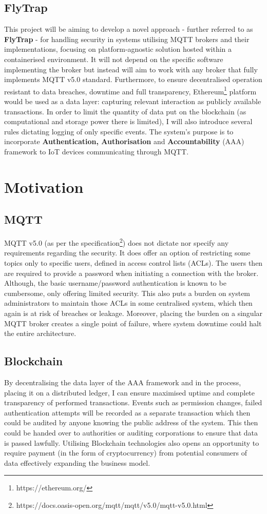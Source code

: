 \subsection{FlyTrap}
This project will be aiming to develop a novel approach - further referred to as \textbf{FlyTrap} - for handling security in systems utilising MQTT brokers and their implementations, focusing on platform-agnostic solution hosted within a containerised environment. It will not depend on the specific software implementing the broker but instead will aim to work with any broker that fully implements MQTT v5.0 standard. Furthermore, to ensure decentralised operation resistant to data breaches, downtime and full transparency, Ethereum\footnote{https://ethereum.org/} platform would be used as a data layer: capturing relevant interaction as publicly available transactions. In order to limit the quantity of data put on the blockchain (as computational and storage power there is limited), I will also introduce several rules dictating logging of only specific events. The system's purpose is to incorporate \textbf{Authentication, Authorisation} and \textbf{Accountability} (AAA) framework to IoT devices communicating through MQTT.

\section{Motivation}

\subsection{MQTT}
MQTT v5.0 (as per the specification\footnote{https://docs.oasis-open.org/mqtt/mqtt/v5.0/mqtt-v5.0.html}) does not dictate nor specify any requirements regarding the security. It does offer an option of restricting some topics only to specific users, defined in access control lists (ACLs). The users then are required to provide a password when initiating a connection with the broker. Although, the basic username/password authentication is known to be cumbersome, only offering limited security. This also puts a burden on system administrators to maintain those ACLs in some centralised system, which then again is at risk of breaches or leakage. Moreover, placing the burden on a singular MQTT broker creates a single point of failure, where system downtime could halt the entire architecture.
\subsection{Blockchain}
By decentralising the data layer of the AAA framework and in the process, placing it on a distributed ledger, I can ensure maximised uptime and complete transparency of performed transactions. Events such as permission changes, failed authentication attempts will be recorded as a separate transaction which then could be audited by anyone knowing the public address of the system. This then could be handed over to authorities or auditing corporations to ensure that data is passed lawfully. Utilising Blockchain technologies also opens an opportunity to require payment (in the form of cryptocurrency) from potential consumers of data effectively expanding the business model. 
